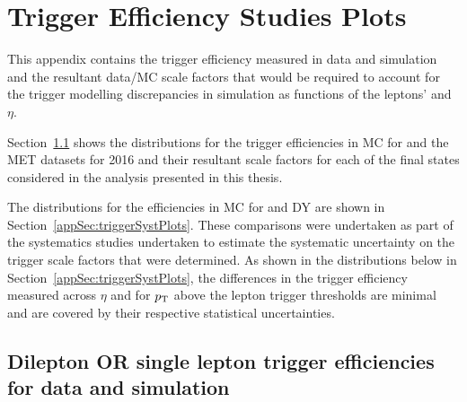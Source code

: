 \chapter{Trigger Efficiency Studies Plots}\label{app:triggerEff}
This appendix contains the trigger efficiency measured in data and simulation and the resultant data/MC scale factors that would be required to account for the trigger modelling discrepancies in simulation as functions of the leptons' \pT and $\eta$.

Section~\ref{appSec:triggerEffPlots} shows the distributions for the trigger efficiencies in MC for \ttbar and the MET datasets for 2016 and their resultant scale factors for each of the final states considered in the analysis presented in this thesis.

The distributions for the efficiencies in MC for \ttbar and DY are shown in Section~\ref{appSec:triggerSystPlots}. 
These comparisons were undertaken as part of the systematics studies undertaken to estimate the systematic uncertainty on the trigger scale factors that were determined.
As shown in the distributions below in Section~\ref{appSec:triggerSystPlots}, the differences in the trigger efficiency measured across $\eta$ and for $p_{\mathrm{T}}$ above the lepton trigger thresholds are minimal and are covered by their respective statistical uncertainties.

\clearpage
\newpage

\section{Dilepton OR single lepton trigger efficiencies for data and \ttbar simulation}\label{appSec:triggerEffPlots}

